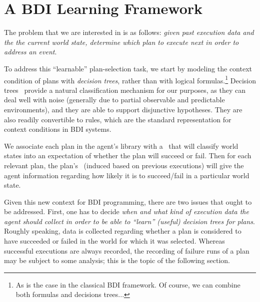 \section{A BDI Learning Framework}\label{sec:framework}


The problem that we are interested in is as follows: \emph{given past execution
data and the the current world state, determine which plan to execute next 
in order to address an event}.


To address this ``learnable'' plan-selection task, we start by modeling the
context condition of plans with \emph{decision trees}, rather than with logical
formulas.\footnote{As is the case in the classical BDI framework. Of course, we
can combine both formulas and decisions trees...}
Decision trees~\cite{Mitchell97:ML}  provide a natural classification mechanism
for our purposes, as they can deal well with noise (generally due to partial
observable and predictable environments), and they are able to support
disjunctive hypotheses. They are also readily convertible to rules, which are the
standard representation for context conditions in BDI systems.


We associate each plan in the agent's library with a \dt\ that will classify world
states into an expectation of whether the plan will succeed or fail. Then for
each relevant plan, the plan's \dt\ (induced based on previous executions) will
give the agent information regarding how likely it is to succeed/fail in a
particular world state.


Given this new context for BDI programming, there are two issues that ought to be
addressed.
First, one has to decide \emph{when and what kind of execution data the agent should
collect in order to be able to ``learn'' (useful) decision trees for plans}.
Roughly speaking, data is collected regarding whether a plan is considered to
have succeeded or failed in the world for which it was selected.
  Whereas successful executions are always recorded, the recording of failure
runs of a plan may be subject to some analysis; this is the topic of the following section.



